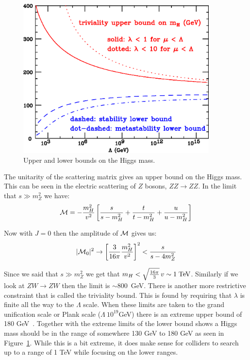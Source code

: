 \begin{figure}[htb]
\centering
\includegraphics[width=0.9\textwidth]{StandardModel/bothbounds.eps}
\caption{Upper and lower bounds on the Higgs mass.~\cite{Ridolfi2001} }
\label{fig:bothbounds}
\end{figure}



The unitarity of the scattering matrix gives an upper bound on the Higgs mass.  This can be seen in the electric scattering of $Z$ bosons, $Z Z \to Z Z$.  In the limit that $s\gg m_Z^2$ we have:
\begin{equation} {\cal M}=-\frac{m_H^2}{v^2}\left[\frac{s}{s-m_H^2}+\frac{t}{t-m_H^2}+\frac{u}{u-m_H^2}\right] \label{eq:unitarity1}\end{equation}

Now with $J=0$ then the amplitude of ${\cal M}$ gives us:
\begin{equation}|{\cal M}_0|^2\to\left[\frac{3}{16\pi}\frac{m_H^2}{v^2}\right]^2<\frac{s}{s-4m_Z^2}\label{eq:unitarity2}\end{equation}

Since we said that $s\gg m_Z^2$ we get that $m_H<\sqrt{\frac{16\pi}{3}}\,v\sim 1\;{\rm TeV}$. Similarly if we look at $Z W \to Z W$ then the limit is $\sim 800$~GeV. There is another more restrictive constraint that is called the triviality bound. This is found by requiring that $\lambda$ is finite all the way to the $\Lambda$ scale.  When these limits are taken to the grand unification scale or Plank scale ($\Lambda ~ 10^{19}$GeV) there is an extreme upper bound of 180 GeV~\cite{Ridolfi2001}.  Together with the extreme limits of the lower bound shows a Higgs mass should be in the range  of somewhere 130 GeV to 180 GeV as seen in Figure~\ref{fig:bothbounds}.  While this is a bit extreme, it does make sense for colliders to search up to a range of 1 TeV while focusing on the lower ranges.

